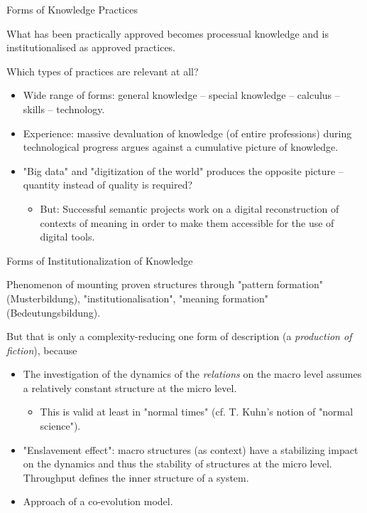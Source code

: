 \documentclass{beamer}
\begin{document}
\begin{frame}{Forms of Knowledge Practices}
  
What has been practically approved becomes processual knowledge and is
institutionalised as approved practices.

Which types of practices are relevant at all?
\begin{itemize}
\item Wide range of forms: general knowledge -- special knowledge -- calculus
  -- skills -- technology.
\item Experience: massive devaluation of knowledge (of entire professions)
  during technological progress argues against a cumulative picture of
  knowledge.
\item "Big data" and "digitization of the world" produces the opposite picture
  -- quantity instead of quality is required?
  \begin{itemize}
  \item But: Successful semantic projects work on a digital reconstruction of
    contexts of meaning in order to make them accessible for the use of
    digital tools.
  \end{itemize}
\end{itemize}
\end{frame}
\begin{frame}{Forms of Institutionalization of Knowledge}
  
Phenomenon of mounting proven structures through "pattern formation"
(Musterbildung), "institutionalisation", "meaning formation"
(Bedeutungsbildung).

But that is only a complexity-reducing one form of description (a
\emph{production of fiction}), because\vspace{-1em}
\begin{itemize}
\item The investigation of the dynamics of the \emph{relations} on the macro
  level assumes a relatively constant structure at the micro level.
  \begin{itemize}
  \item This is valid at least in "normal times" (cf. T. Kuhn's notion of 
    "normal science").
  \end{itemize}
\item "Enslavement effect": macro structures (as context) have a stabilizing
  impact on the dynamics and thus the stability of structures at the micro
  level.  Throughput defines the inner structure of a system.  
\item Approach of a co-evolution model.
\end{itemize}
\end{frame}
\end{document}
